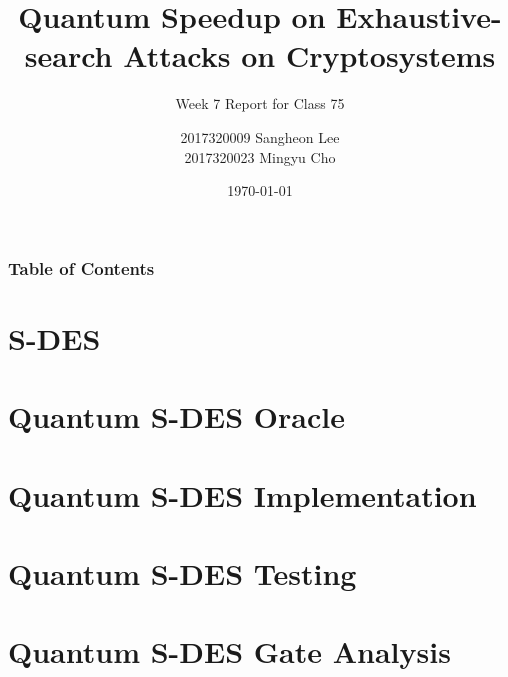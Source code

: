 \documentclass{beamer}
\title{Quantum Speedup on Exhaustive-search Attacks on Cryptosystems}
\subtitle{Week 7 Report for Class 75}
\author{2017320009 Sangheon Lee\\ 2017320023 Mingyu Cho}
\date{\today}
\newif\ifproposal
\begin{document}
    \begin{frame}
        \titlepage
    \end{frame}

    \begin{frame}
        \frametitle{Table of Contents}
        \tableofcontents
    \end{frame}

    \ifproposal
    
    \fi

    \section{S-DES}
    

    \section{Quantum S-DES Oracle}
    

    \section{Quantum S-DES Implementation}
    

    \section{Quantum S-DES Testing}
    

    \section{Quantum S-DES Gate Analysis}
    
\ifproposal
    \section{Current Works and Future Plans}
    
\fi
\end{document}
